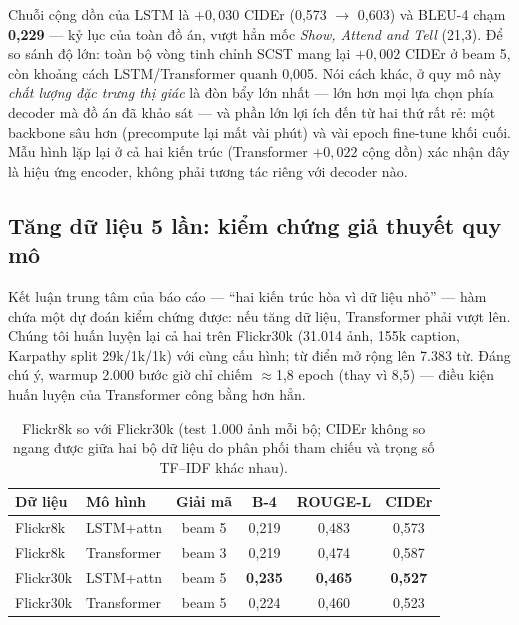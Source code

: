 Chuỗi cộng dồn của LSTM là $+0{,}030$ CIDEr (0,573 $\to$ 0,603) và BLEU-4 chạm
\textbf{0,229} --- kỷ lục của toàn đồ án, vượt hẳn mốc \emph{Show, Attend and
Tell} (21,3). Để so sánh độ lớn: toàn bộ vòng tinh chỉnh SCST mang lại
$+0{,}002$ CIDEr ở beam 5, còn khoảng cách LSTM/Transformer quanh 0,005. Nói
cách khác, ở quy mô này \emph{chất lượng đặc trưng thị giác} là đòn bẩy lớn
nhất --- lớn hơn mọi lựa chọn phía decoder mà đồ án đã khảo sát --- và phần
lớn lợi ích đến từ hai thứ rất rẻ: một backbone sâu hơn (precompute lại mất
vài phút) và vài epoch fine-tune khối cuối. Mẫu hình lặp lại ở cả hai kiến
trúc (Transformer $+0{,}022$ cộng dồn) xác nhận đây là hiệu ứng encoder, không
phải tương tác riêng với decoder nào.

\subsection{Tăng dữ liệu 5 lần: kiểm chứng giả thuyết quy mô}

Kết luận trung tâm của báo cáo --- ``hai kiến trúc hòa vì dữ liệu nhỏ'' ---
hàm chứa một dự đoán kiểm chứng được: nếu tăng dữ liệu, Transformer phải vượt
lên. Chúng tôi huấn luyện lại cả hai trên Flickr30k \autocite{young2014flickr30k}
(31.014 ảnh, 155k caption, Karpathy split 29k/1k/1k) với cùng cấu hình; từ
điển mở rộng lên 7.383 từ. Đáng chú ý, warmup 2.000 bước giờ chỉ chiếm
$\approx$1,8 epoch (thay vì 8,5) --- điều kiện huấn luyện của Transformer công
bằng hơn hẳn.

\begin{table}[H]
	\centering
	\caption{Flickr8k so với Flickr30k (test 1.000 ảnh mỗi bộ; CIDEr không so
	ngang được giữa hai bộ dữ liệu do phân phối tham chiếu và trọng số TF--IDF
	khác nhau).}
	\label{tab:scale}
	\begin{tabular}{llcccc}
		\hline
		\textbf{Dữ liệu} & \textbf{Mô hình} & \textbf{Giải mã} & \textbf{B-4} & \textbf{ROUGE-L} & \textbf{CIDEr} \\
		\hline
		Flickr8k  & LSTM+attn   & beam 5 & 0,219 & 0,483 & 0,573 \\
		Flickr8k  & Transformer & beam 3 & 0,219 & 0,474 & 0,587 \\
		\hline
		Flickr30k & LSTM+attn   & beam 5 & \textbf{0,235} & \textbf{0,465} & \textbf{0,527} \\
		Flickr30k & Transformer & beam 5 & 0,224 & 0,460 & 0,523 \\
		\hline
	\end{tabular}
\end{table}

